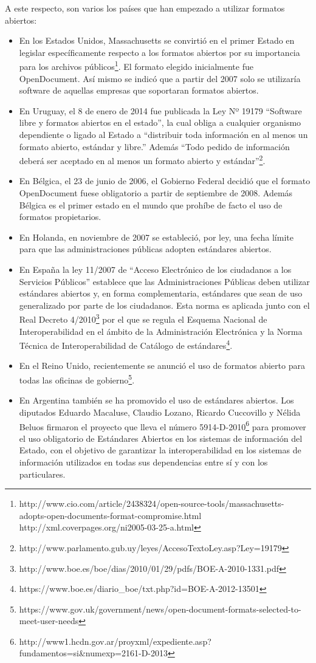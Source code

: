 \documentclass[12pt]{article}
\begin{document}
A este respecto, son varios los países que han empezado a utilizar formatos abiertos:
\begin{itemize}
\item En los Estados Unidos, Massachusetts se convirtió en el primer Estado en legislar específicamente respecto a los formatos abiertos por su importancia para los archivos públicos\footnote{http://www.cio.com/article/2438324/open-source-tools/massachusetts-adopts-open-documents-format-compromise.html
\\http://xml.coverpages.org/ni2005-03-25-a.html}. El formato elegido inicialmente fue OpenDocument. Así mismo se indicó que a partir del 2007 solo se utilizaría software de aquellas empresas que soportaran formatos abiertos.
\item En Uruguay, el 8 de enero de 2014 fue publicada la Ley Nº 19179 ``Software libre y formatos abiertos en el estado'', la cual obliga a cualquier organismo dependiente o ligado al Estado a ``distribuir toda información en al menos un formato abierto, estándar y libre.'' Además ``Todo pedido de información deberá ser aceptado en al menos un formato abierto y estándar''\footnote{http://www.parlamento.gub.uy/leyes/AccesoTextoLey.asp?Ley=19179}.
\item En Bélgica, el 23 de junio de 2006, el Gobierno Federal decidió que el formato OpenDocument fuese obligatorio a partir de septiembre de 2008. Además Bélgica es el primer estado en el mundo que prohíbe de facto el uso de formatos propietarios.
\item En Holanda, en noviembre de 2007 se estableció, por ley, una fecha límite para que las administraciones públicas adopten estándares abiertos.
\item En España la ley 11/2007 de ``Acceso Electrónico de los ciudadanos a los Servicios Públicos'' establece que las Administraciones Públicas deben utilizar estándares abiertos y, en forma complementaria, estándares que sean de uso generalizado por parte de los ciudadanos. Esta norma es aplicada junto con el Real Decreto 4/2010\footnote{http://www.boe.es/boe/dias/2010/01/29/pdfs/BOE-A-2010-1331.pdf} por el que se regula el Esquema Nacional de Interoperabilidad en el ámbito de la Administración Electrónica y la Norma Técnica de Interoperabilidad de Catálogo de estándares\footnote{https://www.boe.es/diario\_boe/txt.php?id=BOE-A-2012-13501}.
\item En el Reino Unido, recientemente se anunció el uso de formatos abierto para todas las oficinas de gobierno\footnote{https://www.gov.uk/government/news/open-document-formats-selected-to-meet-user-needs}.
\item En Argentina también se ha promovido el uso de estándares abiertos. Los diputados Eduardo Macaluse, Claudio Lozano, Ricardo Cuccovillo y Nélida Beluos firmaron el proyecto que lleva el número 5914-D-2010\footnote{http://www1.hcdn.gov.ar/proyxml/expediente.asp?fundamentos=si\&numexp=2161-D-2013} para promover el uso obligatorio de Estándares Abiertos en los sistemas de información del Estado, con el objetivo de garantizar la interoperabilidad en los sistemas de información utilizados en todas sus dependencias entre sí y con los particulares.
\end{itemize}
\end{document}
